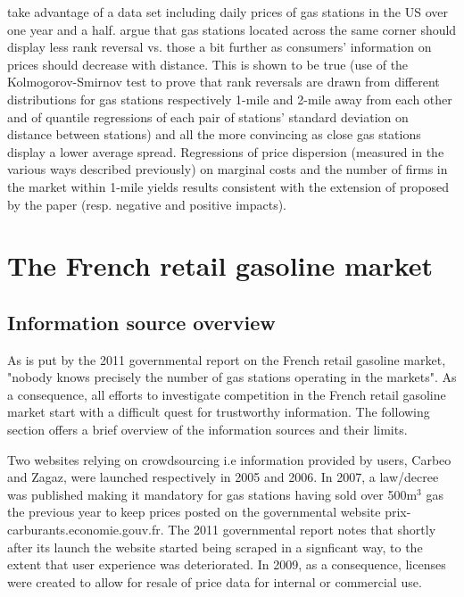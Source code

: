 \documentclass[11pt]{article}
\begin{document}
\cite{TAP11} take advantage of a data set including daily prices of gas stations in the US over one year and a half. \cite{TAP11} argue that gas stations located across the same corner should display less rank reversal vs. those a bit further as consumers' information on prices should decrease with distance. This is shown to be true (use of the Kolmogorov-Smirnov test to prove that rank reversals are drawn from different distributions for gas stations respectively 1-mile and 2-mile away from each other and of quantile regressions of each pair of stations' standard deviation on distance between stations) and all the more convincing as close gas stations display a lower average spread. Regressions of price dispersion (measured in the various ways described previously) on marginal costs and the number of firms in the market within 1-mile yields results consistent with the extension of \cite{VAR80} proposed by the paper (resp. negative and positive impacts).

\section{The French retail gasoline market}

\subsection{Information source overview}

As is put by the 2011 governmental report on the French retail gasoline market, "nobody knows precisely the number of gas stations operating in the markets". As a consequence, all efforts to investigate competition in the French retail gasoline market start with a difficult quest for trustworthy information. The following section offers a brief overview of the information sources and their limits.

Two websites relying on crowdsourcing i.e information provided by users, Carbeo and Zagaz, were launched respectively in 2005 and 2006. In 2007, a law/decree was published making it mandatory for gas stations having sold over 500m$^{3}$ gas the previous year to keep prices posted on the governmental website prix-carburants.economie.gouv.fr. The 2011 governmental report notes that shortly after its launch the website started being scraped in a signficant way, to the extent that user experience was deteriorated. In 2009, as a consequence, licenses were created to allow for resale of price data for internal or commercial use.
\end{document}
